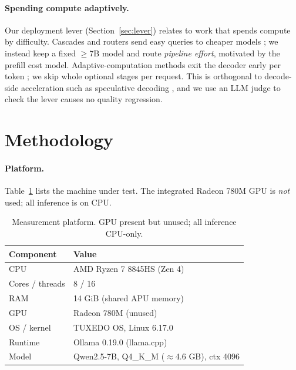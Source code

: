 \documentclass[sigconf,nonacm,10pt]{acmart}
\begin{document}
\paragraph{Spending compute adaptively.}
Our deployment lever (Section~\ref{sec:lever}) relates to work that spends
compute by difficulty. Cascades and routers send easy queries to cheaper
models \cite{chen2023frugalgpt, ong2024routellm}; we instead keep a fixed
$\geq$7B model and route \emph{pipeline effort}, motivated by the prefill
cost model. Adaptive-computation methods exit the decoder early per token
\cite{schuster2022calm}; we skip whole optional stages per request. This is
orthogonal to decode-side acceleration such as speculative decoding
\cite{leviathan2023speculative}, and we use an LLM judge
\cite{zheng2023judging} to check the lever causes no quality regression.

\section{Methodology}
\label{sec:method}

\paragraph{Platform.}
Table~\ref{tab:hardware} lists the machine under test. The integrated
Radeon 780M GPU is \emph{not} used; all inference is on CPU.

\begin{table}[t]
  \centering
  \caption{Measurement platform. GPU present but unused; all inference CPU-only.}
  \label{tab:hardware}
  \begin{tabular}{ll}
    \toprule
    Component & Value \\
    \midrule
    CPU            & AMD Ryzen 7 8845HS (Zen 4) \\
    Cores / threads& 8 / 16 \\
    RAM            & 14 GiB (shared APU memory) \\
    GPU            & Radeon 780M (unused) \\
    OS / kernel    & TUXEDO OS, Linux 6.17.0 \\
    Runtime        & Ollama 0.19.0 (llama.cpp) \\
    Model          & Qwen2.5-7B, Q4\_K\_M ($\approx$4.6 GB), ctx 4096 \\
    \bottomrule
  \end{tabular}
\end{table}
\end{document}
